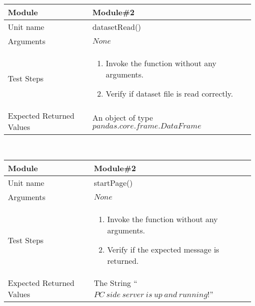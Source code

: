 \\[2\baselineskip]
%
%
\begin{tabular}{|p{4cm}|p{9cm}|}
\hline
Module & Module\#2 \\
\hline
Unit name & datasetRead() \\
\hline
Arguments & $None$ \\
\hline
\vspace*{\baselineskip}Test Steps & \begin{enumerate}
\item Invoke the function without any arguments.
\item Verify if dataset file is read correctly.
\end{enumerate}\\
\hline
Expected Returned Values & An object of type $pandas.core.frame.DataFrame$ \\
\hline
\end{tabular}
\\[2\baselineskip]
%
\begin{tabular}{|p{4cm}|p{9cm}|}
\hline
Module & Module\#2 \\
\hline
Unit name & startPage() \\
\hline
Arguments & $None$ \\
\hline
\vspace*{\baselineskip}Test Steps & \begin{enumerate}
\item Invoke the function without any arguments.
\item Verify if the expected message is returned.
\end{enumerate}\\
\hline
Expected Returned Values & The String ``$PC\ side\ server\ is\ up\ and\ running!$''\\
\hline
\end{tabular}
\\[2\baselineskip]
%
